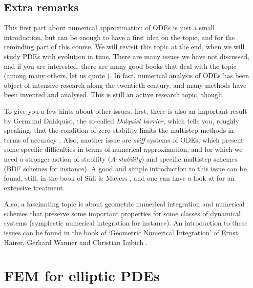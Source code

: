 \documentclass{article}
\begin{document}
\subsection{Extra remarks}

This first part about numerical approximation of ODEs is just a small introduction, but can be enough to have a first idea on the topic, and for the reminding part of this course. We will revisit this topic at the end, when we will study PDEs with evolution in time. There are many issues we have not discussed, and if you are interested, there are many good books that deal with the topic (among many others, let us quote \cite{butcher16,gander14,hairer93,hairer96,suli03}). In fact, numerical analysis of ODEs has been object of intensive research along the twentieth century, and many methods have been invented and analysed. This is still an active research topic, though. 

To give you a few hints about other issues, first, there is also an important result by Germund Dahlquist, the so-called \emph{Dalquist barrier}, which tells you, roughly speaking, that the condition of zero-stability limits the multistep methods in terms of accuracy \cite{suli03}. Also, another issue are \emph{stiff} systems of ODEs, which present some specific difficulties in terms of numerical approximation, and for which we need a stronger notion of stability (\emph{A-stability}) and specific multistep schemes (BDF schemes for instance). A good and simple introduction to this issue can be found, still, in the book of S\"uli \& Mayers \cite[Section 12.11]{suli03}, and one can have a look at \cite{hairer96} for an extensive treatment.

Also, a fascinating topic is about geometric numerical integration and numerical schemes that preserve some important properties for some classes of dynamical systems (symplectic numerical integration for instance). An introduction to these issues can be found in the book of `Geometric Numerical Integration' of Ernst Hairer, Gerhard Wanner and Christian Lubich \cite{hairer02}.


\newpage

\section{FEM for elliptic PDEs}
\end{document}
